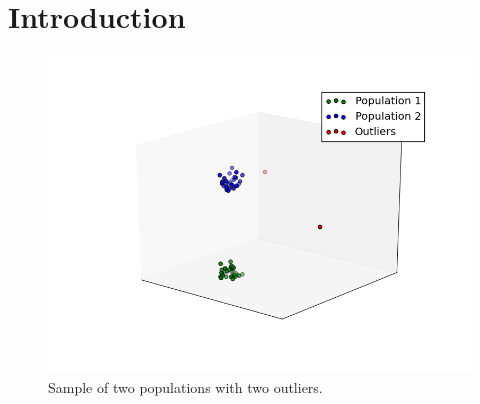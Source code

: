 \documentclass{vldb}
\begin{document}


\section{Introduction}
\label{sec:Introduction}

\begin{figure}
\centering
\includegraphics[width=\linewidth]{"pics/outlier_basic"}
\caption{Sample of two populations with two outliers.}
\label{fig:outlier-basic}
\end{figure}
\end{document}
